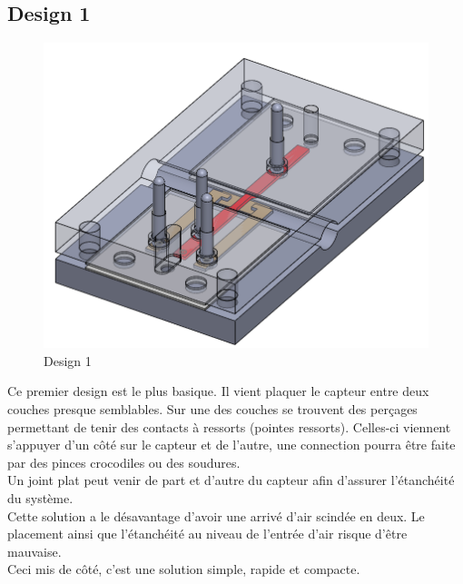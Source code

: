 \subsection{Design 1}
\begin{figure}[H]
    \centering
    \includegraphics[scale = 0.3]{assets/figures/Design7.png}
    \caption{Design 1}
    \label{fig:design1}
\end{figure}
Ce premier design est le plus basique. Il vient plaquer le capteur entre deux couches presque semblables. Sur une des couches se trouvent des
perçages permettant de tenir des contacts à ressorts (pointes ressorts). Celles-ci viennent s'appuyer d'un côté sur le capteur et
de l'autre, une  connection pourra être faite par des pinces crocodiles ou des soudures. \\
Un joint plat peut venir de part et d'autre du capteur afin d'assurer l'étanchéité du système.\\
Cette solution a le désavantage d'avoir une arrivé d'air scindée en deux. Le placement ainsi que l'étanchéité au niveau de l'entrée
d'air risque d'être mauvaise. \\
Ceci mis de côté, c'est une solution simple, rapide et compacte.

